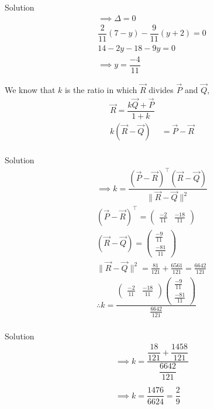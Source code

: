 \documentclass{beamer}
\providecommand{\brak}[1]{\ensuremath{\left(#1\right)}}
\theoremstyle{remark}
\providecommand{\norm}[1]{\lVert#1\rVert}
\newcommand{\myvec}[1]{\ensuremath{\begin{pmatrix}#1\end{pmatrix}}}
\begin{document}
\begin{frame}{Solution}
\begin{align*}
 \implies \Delta=0\\
    \dfrac{2}{11}\brak{7-y} - \dfrac{9}{11}\brak{y+2}=0\\
    14-2y-18-9y=0\\
    \implies y=\dfrac{-4}{11}    
\end{align*}

We know that $k$ is the ratio in which $\vec{R}$ divides $\vec{P}$ and $\vec{Q}$,
\begin{align*}
    \vec{R}=\dfrac{k\vec{Q}+\vec{P}}{1+k}\\
   k\brak{\vec{R}-\vec{Q}}&= \vec{P}-\vec{R}\\
\end{align*}
\end{frame}

\begin{frame}{Solution}
   \begin{align*}
    \implies k =\dfrac{\brak{\vec{P}-\vec{R}}^{\top}\brak{\vec{R}-\vec{Q}}}{\norm{\vec{R}-\vec{Q}}^2}\\
   \brak{\vec{P}-\vec{R}}^{\top}=\myvec{\frac{-2}{11} & \frac{-18}{11}}\\
   \brak{\vec{R}-\vec{Q}}=\myvec{\frac{-9}{11} \\ \frac{-81}{11}}\\
   \norm{\vec{R}-\vec{Q}}^2=\frac{81}{121} + \frac{6561}{121}=\frac{6642}{121}\\
   \therefore k=\dfrac{\myvec{\frac{-2}{11} & \frac{-18}{11}}\myvec{\frac{-9}{11} \\ \frac{-81}{11}}}{\frac{6642}{121}}\\
   \end{align*}


\end{frame}
\begin{frame}{Solution}
    \begin{align*}
        \implies k=\dfrac{\dfrac{18}{121} + \dfrac{1458}{121}}{\dfrac{6642}{121}}\\ \\ 
   \implies k=\dfrac{1476}{6624}=\dfrac{2}{9}
    \end{align*}
\end{frame}
\end{document}

